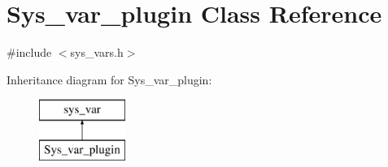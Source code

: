 \hypertarget{classSys__var__plugin}{}\section{Sys\+\_\+var\+\_\+plugin Class Reference}
\label{classSys__var__plugin}


{\ttfamily \#include $<$sys\+\_\+vars.\+h$>$}

Inheritance diagram for Sys\+\_\+var\+\_\+plugin\+:\begin{figure}[H]
\begin{center}
\leavevmode
\includegraphics[height=2.000000cm]{classSys__var__plugin}
\end{center}
\end{figure}
